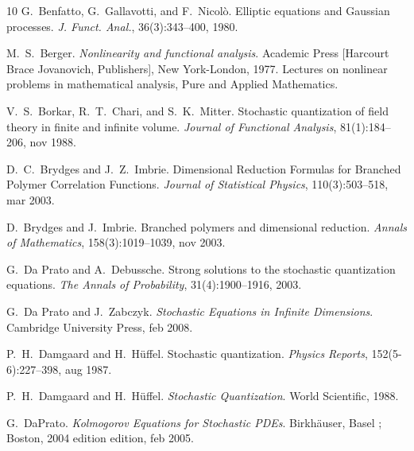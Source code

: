 \documentclass[a4paper,10pt]{article}
\newcommand{\tmtextit}[1]{{\itshape{#1}}}
\begin{document}
\begin{thebibliography}{10}
  G.~Benfatto, G.~Gallavotti, and  F.~Nicol{\`o}.
  {\newblock}Elliptic equations and Gaussian processes.
  {\newblock}\tmtextit{J. Funct. Anal.}, 36(3):343--400, 1980.{\newblock}
  
  M.~S.~Berger. {\newblock}\tmtextit{Nonlinearity and
  functional analysis}. {\newblock}Academic Press [Harcourt Brace Jovanovich,
  Publishers], New York-London, 1977. {\newblock}Lectures on nonlinear
  problems in mathematical analysis, Pure and Applied Mathematics.{\newblock}
  
  V.~S.~Borkar, R.~T.~Chari, and 
  S.~K.~Mitter. {\newblock}Stochastic quantization of field theory in finite
  and infinite volume. {\newblock}\tmtextit{Journal of Functional Analysis},
  81(1):184--206, nov 1988.{\newblock}
  
  D.~C.~Brydges  and  J.~Z.~Imbrie.
  {\newblock}Dimensional Reduction Formulas for Branched Polymer Correlation
  Functions. {\newblock}\tmtextit{Journal of Statistical Physics},
  110(3):503--518, mar 2003.{\newblock}
  
  D.~Brydges  and  J.~Imbrie.
  {\newblock}Branched polymers and dimensional reduction.
  {\newblock}\tmtextit{Annals of Mathematics}, 158(3):1019--1039, nov
  2003.{\newblock}
  
  G.~Da Prato  and  A.~Debussche.
  {\newblock}Strong solutions to the stochastic quantization equations.
  {\newblock}\tmtextit{The Annals of Probability}, 31(4):1900--1916,
  2003.{\newblock}
  
  G.~Da Prato  and  J.~Zabczyk.
  {\newblock}\tmtextit{Stochastic Equations in Infinite Dimensions}.
  {\newblock}Cambridge University Press, feb 2008.{\newblock}
  
  P.~H.~Damgaard  and  H.~H{\"u}ffel.
  {\newblock}Stochastic quantization. {\newblock}\tmtextit{Physics Reports},
  152(5-6):227--398, aug 1987.{\newblock}
  
  P.~H.~Damgaard  and  H.~H{\"u}ffel.
  {\newblock}\tmtextit{Stochastic Quantization}. {\newblock}World Scientific,
  1988.{\newblock}
  
  G.~DaPrato.
  {\newblock}\tmtextit{Kolmogorov Equations for Stochastic PDEs}.
  {\newblock}Birkh{\"a}user, Basel ; Boston, 2004 edition  edition, feb
  2005.{\newblock}
  

\end{thebibliography}
\end{document}
